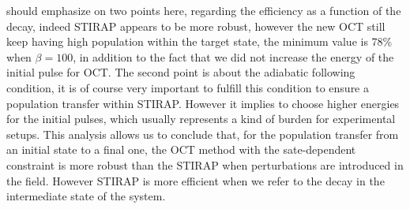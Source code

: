 \documentclass[]{interact}
\theoremstyle{plain}%
\theoremstyle{definition}
\theoremstyle{remark}
\begin{document}
should emphasize on two points here, regarding the efficiency as a function of 
the decay, indeed STIRAP appears to be more robust, however the new OCT 
still keep having high population within the target state, the minimum value is 
78\% when $\beta=100$, in addition to the fact that we did not increase the 
energy of the initial pulse for OCT. The second point is about the adiabatic 
following condition, it is of course very important to fulfill this condition 
to ensure a population transfer within STIRAP. However it implies to choose 
higher energies for the initial pulses, which usually represents a kind of 
burden for experimental setups.
This analysis allows us to conclude that, for the population transfer from an
initial state to a final one, the OCT method with the 
sate-dependent constraint is more robust than the STIRAP when perturbations are
introduced in the field. However STIRAP is more efficient when we refer to the 
decay in the intermediate
state of the system.  

\end{document}
